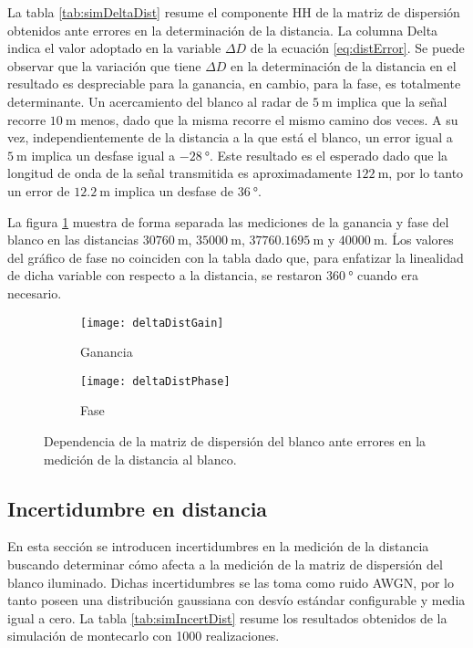 La tabla \ref{tab:simDeltaDist} resume el componente HH de la matriz de dispersión obtenidos ante errores en la determinación de la distancia. La columna Delta indica el valor adoptado en la variable $\Delta D$ de la ecuación \ref{eq:distError}. Se puede observar que la variación que tiene $\Delta D$ en la determinación de la distancia en el resultado es despreciable para la ganancia, en cambio, para la fase, es totalmente determinante. Un acercamiento del blanco al radar de $\SI{5}{\meter}$ implica que la señal recorre $\SI{10}{\meter}$ menos, dado que la misma recorre el mismo camino dos veces. A su vez, independientemente de la distancia a la que está el blanco, un error igual a $\SI{5}{\meter}$ implica un desfase igual a $\SI{-28}{\degree}$. Este resultado es el esperado dado que la longitud de onda de la señal transmitida es aproximadamente $\SI{122}{\meter}$, por lo tanto un error de $\SI{12.2}{\meter}$ implica un desfase de $\SI{36}{\degree}$.

La figura \ref{fig:deltaDistSim} muestra de forma separada las mediciones de la ganancia y fase del blanco en las distancias $\SI{30760}{\meter}$, $\SI{35000}{\meter}$, $\SI{37760.1695}{\meter}$ y $\SI{40000}{\meter}$. Ĺos valores del gráfico de fase no coinciden con la tabla dado que, para enfatizar la linealidad de dicha variable con respecto a la distancia, se restaron $\SI{360}{\degree}$ cuando era necesario.
\begin{figure}[H]
  \centering
  \begin{subfigure}{0.49\textwidth}
    \texttt{[image: deltaDistGain]}
    \caption{Ganancia}
  \end{subfigure}
  \begin{subfigure}{0.49\textwidth}
    \texttt{[image: deltaDistPhase]}
    \caption{Fase}
  \end{subfigure}
  \caption{Dependencia de la matriz de dispersión del blanco ante errores en la medición de la distancia al blanco.}
  \label{fig:deltaDistSim}
\end{figure}


\subsection{Incertidumbre en distancia}

En esta sección se introducen incertidumbres en la medición de la distancia buscando determinar cómo afecta a la medición de la matriz de dispersión del blanco iluminado. Dichas incertidumbres se las toma como ruido AWGN, por lo tanto poseen una distribución gaussiana con desvío estándar configurable y media igual a cero. La tabla \ref{tab:simIncertDist} resume los resultados obtenidos de la simulación de montecarlo con 1000 realizaciones.

